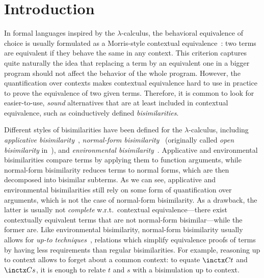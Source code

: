 \documentclass{lmcs}
\theoremstyle{defC}
\begin{document}
\maketitle

\section{Introduction}%
\label{s:intro}

In formal languages inspired by the $\lambda$-calculus, the behavioral
equivalence of choice is usually formulated as a Morris-style contextual
equivalence~\cite{JHMorris:PhD}: two terms are equivalent if they behave the
same in any context. This criterion captures quite naturally the idea that
replacing a term by an equivalent one in a bigger program should not affect the
behavior of the whole program. However, the quantification over contexts makes
contextual equivalence hard to use in practice to prove the equivalence of two
given terms. Therefore, it is common to look for easier-to-use, \emph{sound}
alternatives that are at least included in contextual equivalence, such as
coinductively defined \emph{bisimilarities}.

Different styles of bisimilarities have been defined for the $\lambda$-calculus,
including \emph{applicative bisimilarity}~\cite{Abramsky-Ong:IaC93},
\emph{normal-form bisimilarity}~\cite{Lassen:LICS05} (originally called
\emph{open bisimilarity} in~\cite{Sangiorgi:LICS92}), and \emph{environmental
  bisimilarity}~\cite{Sangiorgi-al:TOPLAS11}. Applicative and environmental
bisimilarities compare terms by applying them to function arguments, while
normal-form bisimilarity reduces terms to normal forms, which are then
decomposed into bisimilar subterms. As we can see, applicative and environmental
bisimilarities still rely on some form of quantification over arguments, which
is not the case of normal-form bisimilarity. As a drawback, the latter is
usually not \emph{complete} w.r.t.\ contextual equivalence---there exist
contextually equivalent terms that are not normal-form bisimilar---while the
former are. Like environmental bisimilarity, normal-form bisimilarity usually
allows for \emph{up-to techniques}~\cite{Sangiorgi-Pous:11}, relations which
simplify equivalence proofs of terms by having less requirements than regular
bisimilarities. For example, reasoning up to context allows to forget about a
common context: to equate $\inctx C t$ and $\inctx C s$, it is enough to relate
$t$ and $s$ with a bisimulation up to context.
\end{document}
